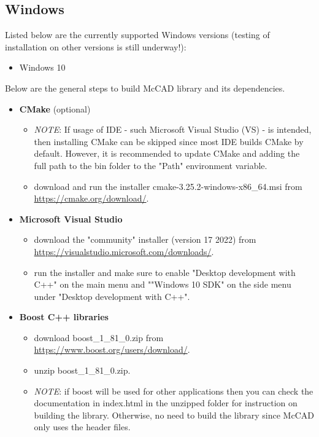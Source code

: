 \documentclass[12pt, a4paper, titlepage]{article}
\begin{document}
  \subsection{Windows}
    Listed below are the currently supported Windows versions (testing of installation on other versions is still underway!):
    \begin{itemize}
  	  \item Windows 10
    \end{itemize} 
    Below are the general steps to build McCAD library and its dependencies.
    \begin{itemize}
	  \item \textbf{CMake} (optional)
 	  \begin{itemize}
    	\item \emph{NOTE}: If usage of IDE - such Microsoft Visual Studio (VS) - is intended, then installing CMake can be skipped since most IDE builds CMake by default. However, it is recommended to update CMake and adding the full path to the bin folder to the "Path" environment variable.
 		\item download and run the installer cmake-3.25.2-windows-x86\_64.msi from \url{https://cmake.org/download/}.
  	  \end{itemize}
	  \item \textbf{Microsoft Visual Studio}
	  \begin{itemize}
		\item download the "community" installer (version 17 2022) from \\\url{https://visualstudio.microsoft.com/downloads/}.
		\item run the installer and make sure to enable "Desktop development with C++" on the main menu and ""Windows 10 SDK" on the side menu under "Desktop development with C++".
	  \end{itemize}
      \item \textbf{Boost C++ libraries}
      \begin{itemize}
    	\item download boost\_1\_81\_0.zip from \url{https://www.boost.org/users/download/}.
    	\item unzip boost\_1\_81\_0.zip.
    	\item \emph{NOTE}: if boost will be used for other applications then you can check the documentation in index.html in the unzipped folder for instruction on building the library. Otherwise, no need to build the library since McCAD only uses the header files.
      \end{itemize}

\end{itemize}
\end{document}
